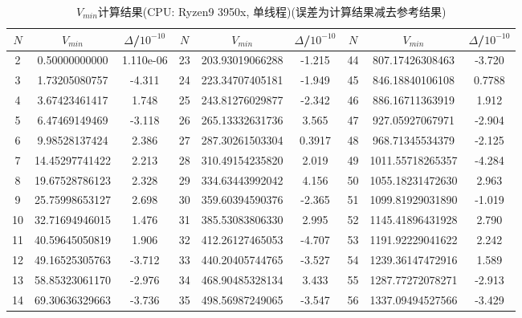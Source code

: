 \documentclass[UTF8]{ctexart}
\begin{document}
            \begin{table}[H]
                \centering
                \caption{$V_{min}$计算结果(CPU: Ryzen9 3950x, 单线程)(误差为计算结果减去参考结果)}
                \begin{tabular}{|c|c|c|c|c|c|c|c|c|}
                    \hline
                    $N$&$V_{min}$&$\Delta$/$10^{-10}$&$N$&$V_{min}$&$\Delta$/$10^{-10}$&$N$&$V_{min}$&$\Delta$/$10^{-10}$\\
                    \hline
                    2&0.50000000000&1.110e-06&23&203.93019066288&-1.215&44&807.17426308463&-3.720\\
                    \hline
                    3&1.73205080757&-4.311&24&223.34707405181&-1.949&45&846.18840106108&0.7788\\
                    \hline
                    4&3.67423461417&1.748&25&243.81276029877&-2.342&46&886.16711363919&1.912\\
                    \hline
                    5&6.47469149469&-3.118&26&265.13332631736&3.565&47&927.05927067971&-2.904\\
                    \hline
                    6&9.98528137424&2.386&27&287.30261503304&0.3917&48&968.71345534379&-2.125\\
                    \hline
                    7&14.45297741422&2.213&28&310.49154235820&2.019&49&1011.55718265357&-4.284\\
                    \hline
                    8&19.67528786123&2.328&29&334.63443992042&4.156&50&1055.18231472630&2.963\\
                    \hline
                    9&25.75998653127&2.698&30&359.60394590376&-2.365&51&1099.81929031890&-1.019\\
                    \hline
                    10&32.71694946015&1.476&31&385.53083806330&2.995&52&1145.41896431928&2.790\\
                    \hline
                    11&40.59645050819&1.906&32&412.26127465053&-4.707&53&1191.92229041622&2.242\\
                    \hline
                    12&49.16525305763&-3.712&33&440.20405744765&-3.527&54&1239.36147472916&1.589\\
                    \hline
                    13&58.85323061170&-2.976&34&468.90485328134&3.433&55&1287.77272078271&-2.913\\
                    \hline
                    14&69.30636329663&-3.736&35&498.56987249065&-3.547&56&1337.09494527566&-3.429\\

\end{tabular}
\end{table}
\end{document}
